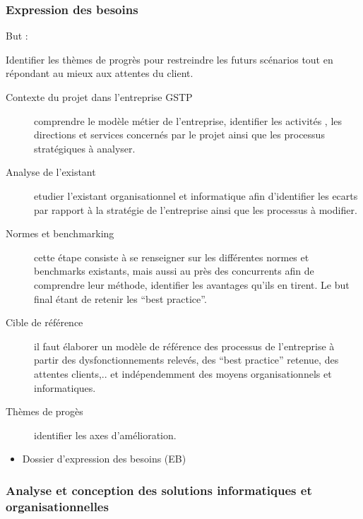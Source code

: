 {\subsubsection{Expression des besoins}

But :
\begin{itemize}
    Identifier les thèmes de progrès pour restreindre les futurs scénarios tout en répondant au mieux aux attentes du client.
\end{itemize}


\begin{description}
    \item[Contexte du projet dans l’entreprise GSTP]{
        comprendre le modèle métier de l'entreprise, identifier les activités , les directions et services concernés par le projet ainsi que les processus stratégiques à analyser.
    }
    \item[Analyse de l’existant]{
        etudier l’existant organisationnel et informatique afin d’identifier les ecarts par rapport à la stratégie de l’entreprise ainsi que les processus à modifier. 
    }

    \item[Normes et benchmarking]{
        cette étape consiste à se renseigner sur les différentes normes et benchmarks existants, mais aussi au près des concurrents afin de comprendre leur méthode, identifier les avantages qu’ils en tirent.  Le but final étant de retenir les “best practice”.
    }

    \item[Cible de référence]{
        il faut élaborer un modèle de référence des processus de l’entreprise à partir des dysfonctionnements relevés, des “best practice” retenue, des attentes clients,..  et indépendemment  des moyens organisationnels et informatiques.
    }

    \item[Thèmes de progès]{
        identifier les axes d’amélioration.
    }
\end{description}

\begin{itemize}
    \item Dossier d’expression des besoins (EB)
\end{itemize}

\subsubsection{Analyse et conception des solutions informatiques et organisationnelles}

}
